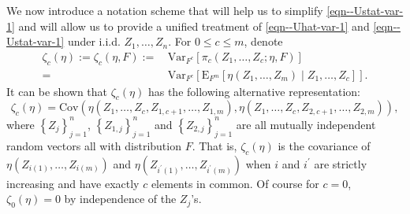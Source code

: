 \documentclass[12pt]{article}
\numberwithin{equation}{section}
\theoremstyle{definition}
\theoremstyle{plain}
\begin{document}
We now introduce a notation scheme that will help us to simplify
\eqref{eqn--Ustat-var-1} and will allow us to provide a unified treatment of
\eqref{eqn--Uhat-var-1} and \eqref{eqn--Ustat-var-1} under i.i.d. \(Z_{1},
\dots, Z_{n}\).
For \(0 \leq c \leq m\), denote
\begin{equation}
  \begin{split}
  \zeta_{c} (\eta) := \zeta_{c} (\eta, F) :=
  & \, \mathrm{Var}_{F^{c}} \left[ \pi_{c} \left( Z_{1}, \dots,
  Z_{c}; \eta, F \right) \right] \\
  =
  & \, \mathrm{Var}_{F^{c}} \left[ \mathrm{E}_{F^{m}} \left[ \eta \left( Z_{1},
  \dots, Z_{m} \right) \middle| Z_{1}, \dots, Z_{c} \right] \right].
  \end{split}
  \label{eqn--zeta-c}
\end{equation}
It can be shown that \(\zeta_{c} (\eta)\) has the following alternative
representation:
\begin{equation}
  \zeta_{c} (\eta) =
  \mathrm{Cov} \left( \eta \left( Z_{1}, \dots, Z_{c}, Z_{1, c + 1}, \dots,
  Z_{1, m} \right), \eta \left( Z_{1}, \dots, Z_{c}, Z_{2, c + 1}, \dots, Z_{2,
  m} \right) \right),
  \label{eqn--zeta-c-cov-eta-c-common}
\end{equation}
where \(\left\{ Z_{j} \right\}_{j = 1}^{n}\), \(\left\{ Z_{1, j} \right\}_{j =
1}^{n}\) and \(\left\{ Z_{2, j} \right\}_{j = 1}^{n}\) are all mutually
independent random vectors all with distribution \(F\).
That is, \(\zeta_{c} (\eta)\) is the covariance of \(\eta \left( Z_{i (1)},
\dots, Z_{i (m)} \right)\) and \(\eta \left( Z_{i^{\prime} (1)}, \dots,
Z_{i^{\prime} (m)} \right)\) when \(i\) and \(i^{\prime}\) are strictly
increasing and have exactly \(c\) elements in common.
Of course for \(c = 0\), \(\zeta_{0} (\eta) = 0\) by independence of the
\(Z_{j}\)'s.
\end{document}
